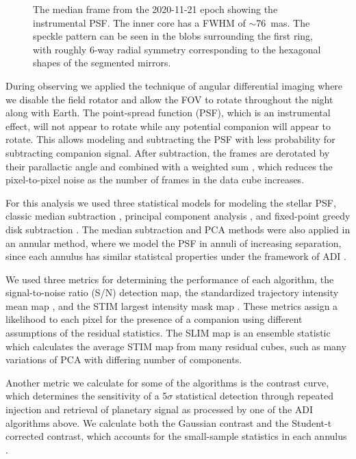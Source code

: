 \documentclass[twocolumn]{aastex631}
\begin{document}
\begin{figure}
    \centering
    \caption{The median frame from the 2020-11-21 epoch showing the instrumental PSF. The inner core has a FWHM of $\sim$\SI{76}{mas}. The speckle pattern can be seen in the blobs surrounding the first ring, with roughly 6-way radial symmetry corresponding to the hexagonal shapes of the segmented mirrors.}
    \label{fig:psf}
\end{figure}

During observing we applied the technique of angular differential imaging \citep[ADI;][]{marois_angular_2006} where we disable the field rotator and allow the FOV to rotate throughout the night along with Earth. The point-spread function (PSF), which is an instrumental effect, will not appear to rotate while any potential companion will appear to rotate. This allows modeling and subtracting the PSF with less probability for subtracting companion signal. After subtraction, the frames are derotated by their parallactic angle and combined with a weighted sum \citep{bottom_noise-weighted_2017}, which reduces the pixel-to-pixel noise as the number of frames in the data cube increases.

For this analysis we used three statistical models for modeling the stellar PSF, classic median subtraction \citep{marois_angular_2006}, principal component analysis \citep[PCA;][]{soummer_detection_2012}, and fixed-point greedy disk subtraction \citep[GreeDS;][]{pairet_reference-less_2019,pairet_mayonnaise_2020}. The median subtraction and PCA methods were also applied in an annular method, where we model the PSF in annuli of increasing separation, since each annulus has similar statistcal properties under the framework of ADI \citep{marois_angular_2006}.

We used three metrics for determining the performance of each algorithm, the signal-to-noise ratio (S/N) detection map, the standardized trajectory intensity mean map \citep[STIM map;][]{pairet_stim_2019}, and the STIM largest intensity mask map \citep[SLIM map;][]{pairet_signal_2020}. These metrics assign a likelihood to each pixel for the presence of a companion using different assumptions of the residual statistics. The SLIM map is an ensemble statistic which calculates the average STIM map from many residual cubes, such as many variations of PCA with differing number of components.

Another metric we calculate for some of the algorithms is the contrast curve, which determines the sensitivity of a 5$\sigma$ statistical detection through repeated injection and retrieval of planetary signal as processed by one of the ADI algorithms above. We calculate both the Gaussian contrast and the Student-t corrected contrast, which accounts for the small-sample statistics in each annulus \citep{mawet_fundamental_2014}.
\end{document}
